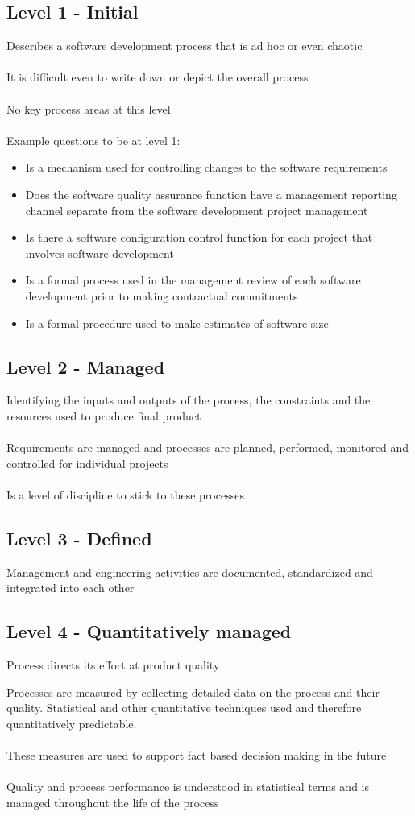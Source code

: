 \documentclass{article}[18pt]
\begin{document}
\subsection{Level 1 - Initial}
Describes a software development process that is ad hoc or even chaotic\\
\\
It is difficult even to write down or depict the overall process\\
\\
No key process areas at this level\\
\\
Example questions to be at level 1:
\begin{itemize}
	\item Is a mechanism used for controlling changes to the software requirements
	\item Does the software quality assurance function have a management reporting channel separate from the software development project management
	\item Is there a software configuration control function for each project that involves software development
	\item Is a formal process used in the management review of each software development prior to making contractual commitments
	\item Is a formal procedure used to make estimates of software size
\end{itemize}
\subsection{Level 2 - Managed}
Identifying the inputs and outputs of the process, the constraints and the resources used to produce final product\\
\\
Requirements are managed and processes are planned, performed, monitored and controlled for individual projects\\
\\
Is a level of discipline to stick to these processes
\subsection{Level 3 - Defined}
Management and engineering activities are documented, standardized and integrated into each other
\subsection{Level 4 - Quantitatively managed}
\begin{definition}
	Process directs its effort at product quality
\end{definition}
Processes are measured by collecting detailed data on the process and their quality. Statistical and other quantitative techniques used and therefore quantitatively predictable.\\
\\
These measures are used to support fact based decision making in the future\\
\\
Quality and process performance is understood in statistical terms and is managed throughout the life of the process
\end{document}
